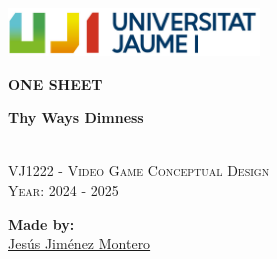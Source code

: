\documentclass[12pt]{article}
\newcommand{\gameTitle}{\textbf{Thy Ways Dimness}}
\begin{document}
\begin{titlepage}
    \centering
    \vspace*{5cm}

    \includegraphics[width=0.5\textwidth]{Imagenes/marca-uji-color.jpg}\par\vspace{1cm}

    {\Huge \bfseries ONE SHEET \par}
    {\large \bfseries \gameTitle \par}

    \textsc{\large }
    \vspace{0.5cm} \\
    \textsc{\Large VJ1222 - Video Game Conceptual Design}
    \vspace{0.5cm} \\
    \textsc{\large Year: 2024 - 2025}
    \vfill

    \textbf{Made by:}         \\
    \href{https://www.richardotomislav.com/}{Jesús Jiménez Montero }      \\

    \vspace{1cm}

    \vfill
\end{titlepage}


\renewcommand{\contentsname}{Table of Contents}
\tableofcontents
\newpage




\end{document}
